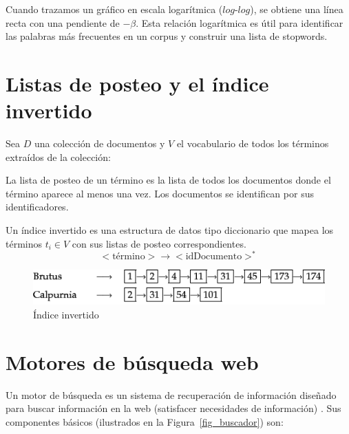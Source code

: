 Cuando trazamos un gráfico en escala logarítmica ($log$-$log$), se obtiene una línea recta con una pendiente de $-\beta$. Esta relación logarítmica es útil para identificar las palabras más frecuentes en un corpus y construir una lista de stopwords.


\section{Listas de posteo y el índice invertido}
Sea $D$ una colección de documentos y $V$ el vocabulario de todos los términos extraídos de la colección:


\begin{definition}
La lista de posteo de un término es la lista de todos los documentos donde el término aparece al menos una vez. Los documentos se identifican por sus identificadores. 
\end{definition}

\begin{definition}
Un índice invertido es una estructura de datos tipo diccionario que mapea los términos $t_{i} \in V$ con sus listas de posteo correspondientes.
\begin{displaymath}
<\text{término}> \rightarrow <\text{idDocumento}>^*
\end{displaymath} 
\end{definition}



\begin{figure}[h!]
\centering
\includegraphics[scale=0.6]{pics/invFile.png}
\caption{Índice invertido}
\end{figure}

\section{Motores de búsqueda web}

Un motor de búsqueda es un sistema de recuperación de información diseñado para buscar información en la web (satisfacer necesidades de información) \cite{manning2008}. Sus componentes básicos (ilustrados en la Figura~\ref{fig_buscador}) son:

